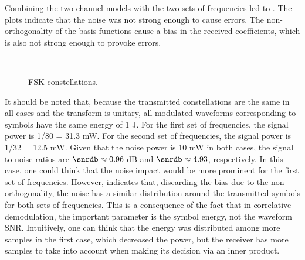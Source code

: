 Combining the two channel models with the two sets of frequencies led to . The plots indicate that the noise was not strong enough to cause errors. The non-orthogonality of the basis functions cause a bias in the received coefficients, which is also not strong enough to provoke errors.

\begin{figure}[htbp]
  \begin{center}
    \\
  \end{center}
  \caption{FSK constellations.}
  \label{fig:fsk_results}
\end{figure}

It should be noted that, because the transmitted constellations are the same in all cases and the transform is unitary, all modulated waveforms corresponding to symbols have the same energy of 1 J. For the first set of frequencies, the signal power is 1/80 = 31.3 mW. For the second set of frequencies, the signal power is 1/32 = 12.5 mW. Given that the noise power is 10 mW in both cases, the signal to noise ratios are $\snrdb \approx 0.96$ dB and $\snrdb \approx 4.93$, respectively. In this case, one could think that the noise impact would be more prominent for the first set of frequencies. However,  indicates that, discarding the bias due to the non-orthogonality, the noise has a similar distribution around the transmitted symbols for both sets of frequencies. This is a consequence of the fact that in correlative demodulation, the important parameter is the symbol energy, not the waveform SNR. Intuitively, one can think that the energy was distributed among more samples in the first case, which decreased the power, but the receiver has more samples to take into account when making its decision via an inner product.
\eApplication


